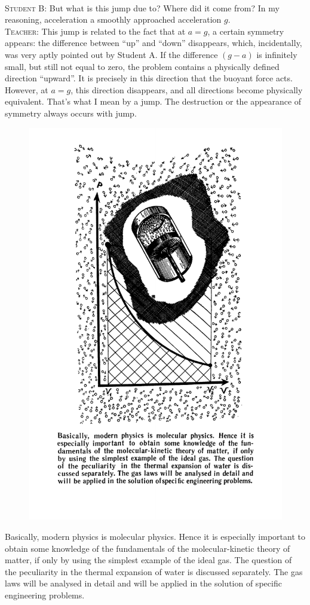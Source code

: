 \documentclass[a4paper,sfsidenotes]{tufte-book}
\begin{document}
\\
\textsc{Student B:} But what is this jump due to? Where did it come from? In my reasoning, acceleration a smoothly approached acceleration $g$.
\\
\textsc{Teacher:} This jump is related to the fact that at $a=g$, a certain symmetry appears: the difference between ``up'' and ``down'' disappears, which, incidentally, was very aptly pointed out by Student A. If the difference $(g-a)$ is infinitely small, but still not equal to zero, the problem contains a physically defined direction ``upward''. It is precisely in this direction that the buoyant force acts. However, at $a=g$, this direction disappears, and all directions become physically equivalent. That's what I mean by a jump. The destruction or the appearance of symmetry always occurs with jump.



\cleardoublepage
\thispagestyle{empty}
\vspace*{2cm}

\begin{figure}
\centering
\includegraphics[width=0.65\linewidth]{sec-h.pdf}
\end{figure}
\begin{fullwidth}
\begin{Large}
Basically, modern physics is molecular physics. Hence it is especially important to obtain some knowledge of the fundamentals of the molecular-kinetic theory of matter, if only by using the simplest example of the ideal gas. The question of the peculiarity in the thermal expansion of water is discussed separately. The gas laws will be analysed in detail and will be applied in the solution of specific engineering problems.
\end{Large}
\end{fullwidth}
\end{document}
